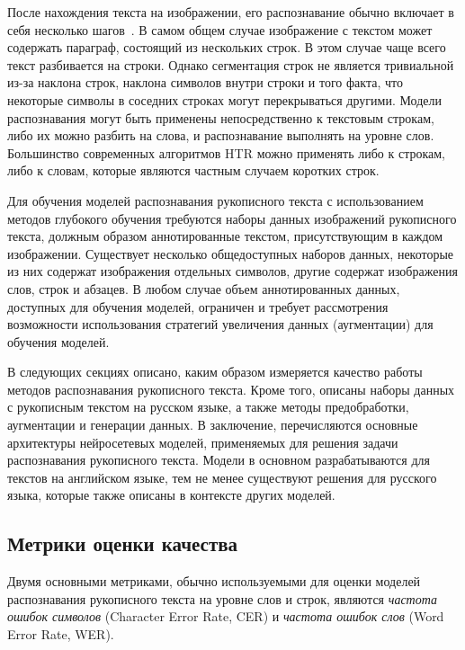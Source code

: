 После нахождения текста на изображении, его распознавание обычно включает в себя несколько шагов~\cite{plamondon2000online}.
В самом общем случае изображение с текстом может содержать параграф, состоящий из нескольких строк.
В этом случае чаще всего текст разбивается на строки.
Однако сегментация строк не является тривиальной из-за наклона строк, наклона символов внутри строки и того факта,
что некоторые символы в соседних строках могут перекрываться другими.
Модели распознавания могут быть применены непосредственно к текстовым строкам, либо их можно разбить на слова, и распознавание выполнять на уровне слов.
Большинство современных алгоритмов HTR можно применять либо к строкам, либо к словам, которые являются частным случаем коротких строк.

Для обучения моделей распознавания рукописного текста с использованием методов глубокого обучения
требуются наборы данных изображений рукописного текста, должным образом аннотированные текстом, присутствующим в каждом изображении.
Существует несколько общедоступных наборов данных, некоторые из них содержат изображения отдельных символов,
другие содержат изображения слов, строк и абзацев.
В любом случае объем аннотированных данных, доступных для обучения моделей, ограничен и требует рассмотрения возможности
использования стратегий увеличения данных (аугментации) для обучения моделей.

В следующих секциях описано, каким образом измеряется качество работы методов распознавания рукописного текста.
Кроме того, описаны наборы данных с рукописным текстом на русском языке, а также методы предобработки, аугментации и генерации данных.
В заключение, перечисляются основные архитектуры нейросетевых моделей, применяемых для решения задачи распознавания рукописного текста.
Модели в основном разрабатываются для текстов на английском языке, тем не менее существуют решения для русского языка,
которые также описаны в контексте других моделей.


\subsection{Метрики оценки качества}
\label{subsec:evaluation-metrics}

Двумя основными метриками, обычно используемыми для оценки моделей распознавания рукописного текста на уровне слов и строк,
являются \textit{частота ошибок символов} (Character Error Rate, CER) и \textit{частота ошибок слов} (Word Error Rate, WER).


